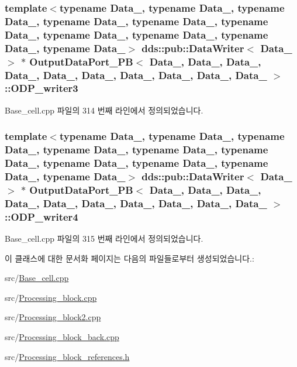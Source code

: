 \subsubsection[{\texorpdfstring{O\+D\+P\+\_\+writer3}{ODP_writer3}}]{\setlength{\rightskip}{0pt plus 5cm}template$<$typename Data\+\_, typename Data\+\_, typename Data\+\_, typename Data\+\_, typename Data\+\_, typename Data\+\_, typename Data\+\_, typename Data\+\_, typename Data\+\_, typename Data\+\_$>$ dds\+::pub\+::\+Data\+Writer$<$ Data\+\_ $>$ $\ast$ {\bf Output\+Data\+Port\+\_\+\+PB}$<$ Data\+\_, Data\+\_, Data\+\_, Data\+\_, Data\+\_, Data\+\_, Data\+\_, Data\+\_, Data\+\_, Data\+\_ $>$\+::O\+D\+P\+\_\+writer3}\hypertarget{classOutputDataPort__PB_a8445d09227ccdf35a490b43474d601cd}{}\label{classOutputDataPort__PB_a8445d09227ccdf35a490b43474d601cd}


Base\+\_\+cell.\+cpp 파일의 314 번째 라인에서 정의되었습니다.

\subsubsection[{\texorpdfstring{O\+D\+P\+\_\+writer4}{ODP_writer4}}]{\setlength{\rightskip}{0pt plus 5cm}template$<$typename Data\+\_, typename Data\+\_, typename Data\+\_, typename Data\+\_, typename Data\+\_, typename Data\+\_, typename Data\+\_, typename Data\+\_, typename Data\+\_, typename Data\+\_$>$ dds\+::pub\+::\+Data\+Writer$<$ Data\+\_ $>$ $\ast$ {\bf Output\+Data\+Port\+\_\+\+PB}$<$ Data\+\_, Data\+\_, Data\+\_, Data\+\_, Data\+\_, Data\+\_, Data\+\_, Data\+\_, Data\+\_, Data\+\_ $>$\+::O\+D\+P\+\_\+writer4}\hypertarget{classOutputDataPort__PB_ad5b06dde3b83d3a2e11138f4b58735a1}{}\label{classOutputDataPort__PB_ad5b06dde3b83d3a2e11138f4b58735a1}


Base\+\_\+cell.\+cpp 파일의 315 번째 라인에서 정의되었습니다.



이 클래스에 대한 문서화 페이지는 다음의 파일들로부터 생성되었습니다.\+:\begin{DoxyCompactItemize}
\item 
src/\hyperlink{Base__cell_8cpp}{Base\+\_\+cell.\+cpp}\item 
src/\hyperlink{Processing__block_8cpp}{Processing\+\_\+block.\+cpp}\item 
src/\hyperlink{Processing__block2_8cpp}{Processing\+\_\+block2.\+cpp}\item 
src/\hyperlink{Processing__block__back_8cpp}{Processing\+\_\+block\+\_\+back.\+cpp}\item 
src/\hyperlink{Processing__block__references_8h}{Processing\+\_\+block\+\_\+references.\+h}\end{DoxyCompactItemize}
